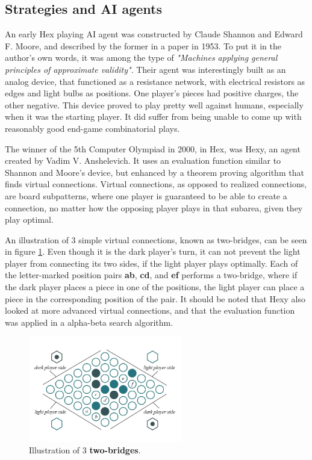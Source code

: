 \subsection{Strategies and AI agents}
An early Hex playing AI agent was constructed by Claude Shannon and Edward F. Moore, and described by the former in a paper in 1953. To put it in the author's own words, it was among the type of \textit{"Machines applying general principles of approximate validity"}\cite[705-706]{Shannon1953}. Their agent was interestingly built as an analog device, that functioned as a resistance network, with electrical resistors as edges and light bulbs as positions. One player's pieces had positive charges, the other negative. This device proved to play pretty well against humans, especially when it was the starting player. It did suffer from being unable to come up with reasonably good end-game combinatorial plays\cite{Shannon1953}.

The winner of the 5th Computer Olympiad in 2000, in Hex, was Hexy, an agent created by Vadim V. Anshelevich. It uses an evaluation function similar to Shannon and Moore's device, but enhanced by a theorem proving algorithm that finds virtual connections. Virtual connections, as opposed to realized connections, are board subpatterns, where one player is guaranteed to be able to create a connection, no matter how the opposing player plays in that subarea, given they play optimal\citep{Anshelevich2000}.

An illustration of 3 simple virtual connections, known as two-bridges, can be seen in figure \ref{fig-two-bridge}. Even though it is the dark player's turn, it can not prevent the light player from connecting its two sides, if the light player plays optimally. Each of the letter-marked position pairs \textbf{ab}, \textbf{cd}, and \textbf{ef} performs a two-bridge, where if the dark player places a piece in one of the positions, the light player can place a piece in the corresponding position of the pair. It should be noted that Hexy also looked at more advanced virtual connections, and that the evaluation function was applied in a alpha-beta search algorithm.

\begin{figure}[ht]
	\centering
	\includegraphics[width=0.6\textwidth]{figures/hex-two-bridges}
	\caption{Illustration of 3 \textbf{two-bridges}.}
	\label{fig-two-bridge}
\end{figure}

